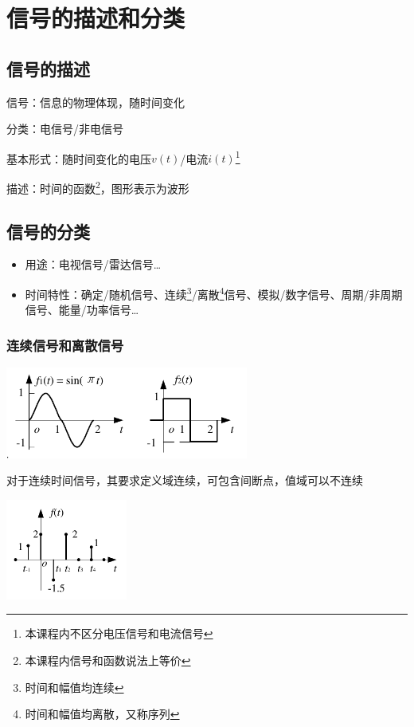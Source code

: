 \section{信号的描述和分类}

\subsection{信号的描述}

信号：信息的物理体现，随时间变化

分类：电信号/非电信号

基本形式：随时间变化的电压$v(t)$/电流$i(t)$\footnote{本课程内不区分电压信号和电流信号}

描述：时间的函数\footnote{本课程内信号和函数说法上等价}，图形表示为波形

\subsection{信号的分类}

\begin{itemize}
    \item 用途：电视信号/雷达信号\dots
    \item 时间特性：确定/随机信号、连续\footnote{时间和幅值均连续}/离散\footnote{时间和幅值均离散，又称序列}信号、模拟/数字信号、周期/非周期信号、能量/功率信号\dots
\end{itemize}

\subsubsection{连续信号和离散信号}

\begin{Figure}[连续信号]
    \includegraphics[width=80mm]{visio/1.2.pdf}
\end{Figure}

对于连续时间信号，其要求定义域连续，可包含间断点，值域可以不连续

\begin{Figure}[离散信号]
    \includegraphics[width=40mm]{visio/1.3.pdf}
\end{Figure}

